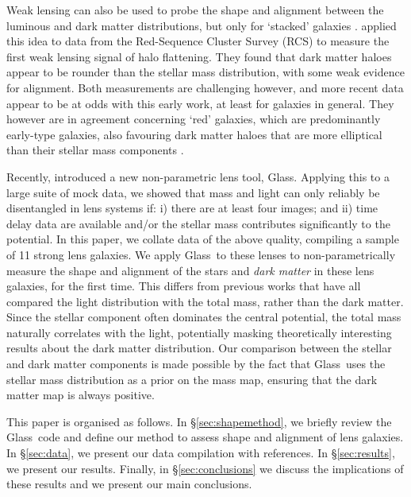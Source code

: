 \documentclass[useAMS,usenatbib]{mn2e}
\def\Glass{{\sc Glass}}
\begin{document}
Weak lensing can also be used to probe the shape and alignment between the luminous and dark matter distributions, but only for `stacked' galaxies \citep{2000astro.ph..6281B,2000ApJ...538L.113N}. \citet{2004ApJ...606...67H} applied this idea to data from the Red-Sequence Cluster Survey (RCS) to measure the first weak lensing signal of halo flattening. They found that dark matter haloes appear to be rounder than the stellar mass distribution, with some weak evidence for alignment. Both measurements are challenging however, and more recent data appear to be at odds with this early work, at least for galaxies in general. They however are in agreement concerning `red' galaxies, which are predominantly early-type galaxies, also favouring dark matter haloes that are more elliptical than their stellar mass components \citep{2006MNRAS.370.1008M,2007ApJ...669...21P,2012A&A...545A..71V}.

Recently, \cite{2014MNRAS.445.2181C} introduced a new non-parametric lens tool, \Glass. Applying this to a large suite of mock data, we showed that mass and light can only reliably be disentangled in lens systems if: i) there are at least four images; and ii) time delay data are available and/or the stellar mass contributes significantly to the potential. In this paper, we collate data of the above quality, compiling a sample of 11 strong lens galaxies. We apply \Glass\ to these lenses to non-parametrically measure the shape and alignment of the stars and {\it dark matter} in these lens galaxies, for the first time. This differs from previous works that have all compared the light distribution with the total mass, rather than the dark matter. Since the stellar component often dominates the central potential, the total mass naturally correlates with the light, potentially masking theoretically interesting results about the dark matter distribution. Our comparison between the stellar and dark matter components is made possible by the fact that \Glass\ uses the stellar mass distribution as a prior on the mass map, ensuring that the dark matter map is always positive.

This paper is organised as follows. In \S\ref{sec:shapemethod}, we briefly review the \Glass\ code and define our method to assess shape and alignment of lens galaxies. In \S\ref{sec:data}, we present our data compilation with references. In \S\ref{sec:results}, we present our results. Finally, in \S\ref{sec:conclusions} we discuss the implications of these results and we present our main conclusions.
\end{document}

